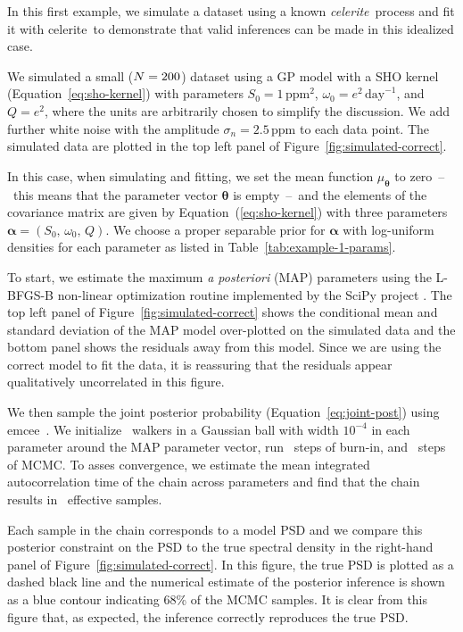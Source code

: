 \documentclass[manuscript, letterpaper]{aastex6}
\makeatletter
\let\origsubsection\subsection
\renewcommand\subsection{\@ifstar{\starsubsection}{\nostarsubsection}}
\newcommand\nostarsubsection[1]{\subsectionprelude\origsubsection{#1}}
\newcommand\starsubsection[1]{\subsectionprelude\origsubsection*{#1}}
\newcommand\subsectionprelude{\vspace{1em}}
\newcommand{\project}[1]{\textsf{#1}}
\newcommand{\celerite}{\project{celerite}}
\newcommand{\celeriteterm}{\emph{celerite}}
\newcommand{\emcee}{\project{emcee}}
\newcommand{\figureref}[1]{\ref{fig:#1}}
\newcommand{\Figure}[1]{Figure~\figureref{#1}}
\renewcommand{\eqref}[1]{\ref{eq:#1}}
\newcommand{\Eq}[1]{Equation~(\eqref{#1})}
\newcommand{\eq}[1]{\Eq{#1}}
\newcommand{\eqalt}[1]{Equation~\eqref{#1}}
\newcommand{\bvec}[1]{{\ensuremath{\boldsymbol{#1}}}}
\newcommand{\response}[1]{{\color{blue}#1}}
\makeatother
\begin{document}
\subsection{Recovery of a celerite process}

In this first example, we simulate a dataset using a known \celeriteterm\
process and fit it with \celerite\ to demonstrate that valid inferences can be
made in this idealized case.
\response{We simulated a small ($N = 200$) dataset using a GP model
with a SHO kernel (\eqalt{sho-kernel}) with parameters $S_0 =
1\,\mathrm{ppm}^2$, $\omega_0 = e^2\,\mathrm{day}^{-1}$, and $Q = e^2$, where
the units are arbitrarily chosen to simplify the discussion.
We add further white noise with the amplitude $\sigma_n = 2.5\, \mathrm{ppm}$
to each data point.
The simulated data are plotted in the top left panel of
\Figure{simulated-correct}.

In this case, when simulating and fitting, we set the mean function
$\mu_\bvec{\theta}$ to zero~--~this means that the parameter vector
$\bvec{\theta}$ is empty~--~and the elements of the covariance matrix are
given by \eq{sho-kernel} with three parameters $\bvec{\alpha} = (S_0,\,
\omega_0,\,Q)$.
We choose a proper separable prior for $\bvec{\alpha}$ with log-uniform
densities for each parameter as listed in Table~\ref{tab:example-1-params}.

To start, we estimate the maximum \emph{a posteriori} (MAP) parameters using
the \project{L-BFGS-B} non-linear optimization routine \citep{Byrd:1995,
Zhu:1997} implemented by the \project{SciPy} project \citep{Jones:2001}.
The top left panel of \Figure{simulated-correct} shows the conditional mean
and standard deviation of the MAP model over-plotted on the simulated data and
the bottom panel shows the residuals away from this model.
Since we are using the correct model to fit the data, it is reassuring that
the residuals appear qualitatively uncorrelated in this figure.

We then sample the joint posterior probability (\eqalt{joint-post}) using
\emcee\ \citep{Goodman:2010, Foreman-Mackey:2013}.
We initialize \exampleinwalkers~walkers in a Gaussian ball with width
$10^{-4}$ in each parameter around the MAP parameter vector, run
\exampleinburn~steps of burn-in, and \exampleinsteps~steps of MCMC.
To asses convergence, we estimate the mean integrated autocorrelation time of
the chain across parameters \citep{Sokal:1989, Goodman:2010} and find that the
chain results in \exampleineff~effective samples.

Each sample in the chain corresponds to a model PSD and we compare this
posterior constraint on the PSD to the true spectral density in the
right-hand panel of \Figure{simulated-correct}.
In this figure, the true PSD is plotted as a dashed black line and the
numerical estimate of the posterior inference is shown as a blue contour
indicating 68\% of the MCMC samples.
It is clear from this figure that, as expected, the inference correctly
reproduces the true PSD.
}
\end{document}
